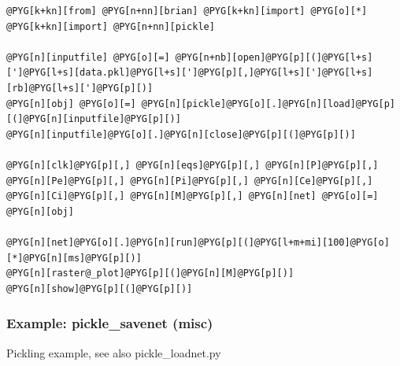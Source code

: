 \documentclass[letterpaper,10pt,english]{manual}
\begin{document}
\begin{Verbatim}[commandchars=@\[\]]
@PYG[k+kn][from] @PYG[n+nn][brian] @PYG[k+kn][import] @PYG[o][*]
@PYG[k+kn][import] @PYG[n+nn][pickle]

@PYG[n][inputfile] @PYG[o][=] @PYG[n+nb][open]@PYG[p][(]@PYG[l+s][']@PYG[l+s][data.pkl]@PYG[l+s][']@PYG[p][,]@PYG[l+s][']@PYG[l+s][rb]@PYG[l+s][']@PYG[p][)]
@PYG[n][obj] @PYG[o][=] @PYG[n][pickle]@PYG[o][.]@PYG[n][load]@PYG[p][(]@PYG[n][inputfile]@PYG[p][)]
@PYG[n][inputfile]@PYG[o][.]@PYG[n][close]@PYG[p][(]@PYG[p][)]

@PYG[n][clk]@PYG[p][,] @PYG[n][eqs]@PYG[p][,] @PYG[n][P]@PYG[p][,] @PYG[n][Pe]@PYG[p][,] @PYG[n][Pi]@PYG[p][,] @PYG[n][Ce]@PYG[p][,] @PYG[n][Ci]@PYG[p][,] @PYG[n][M]@PYG[p][,] @PYG[n][net] @PYG[o][=] @PYG[n][obj]

@PYG[n][net]@PYG[o][.]@PYG[n][run]@PYG[p][(]@PYG[l+m+mi][100]@PYG[o][*]@PYG[n][ms]@PYG[p][)]
@PYG[n][raster@_plot]@PYG[p][(]@PYG[n][M]@PYG[p][)]
@PYG[n][show]@PYG[p][(]@PYG[p][)]
\end{Verbatim}

\resetcurrentobjects
\hypertarget{--doc-examples-misc_pickle_savenet}{}

\hypertarget{index-59}{}\subsubsection{Example: pickle\_savenet (misc)}

Pickling example, see also pickle\_loadnet.py
\end{document}
